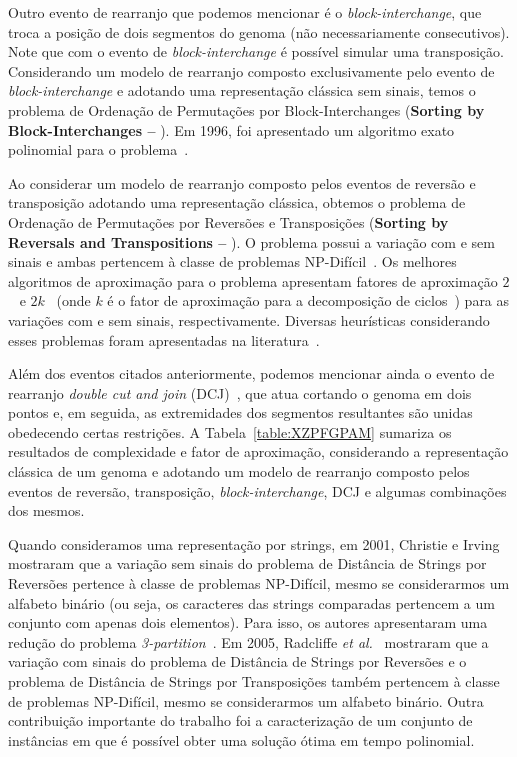 Outro evento de rearranjo que podemos mencionar é o \emph{block-interchange}, que troca a posição de dois segmentos do genoma (não necessariamente consecutivos). Note que com o evento de \emph{block-interchange} é possível simular uma transposição. Considerando um modelo de rearranjo composto exclusivamente pelo evento de \emph{block-interchange} e adotando uma representação clássica sem sinais, temos o problema de Ordenação de Permutações por Block-Interchanges (\textbf{Sorting by Block-Interchanges --} \SbBI). Em 1996, foi apresentado um algoritmo exato polinomial para o problema~\cite{1996-christie}.

Ao considerar um modelo de rearranjo composto pelos eventos de reversão e transposição adotando uma representação clássica, obtemos o problema de Ordenação de Permutações por Reversões e Transposições (\textbf{Sorting by Reversals and Transpositions --} \SbRT). O problema possui a variação com e sem sinais e ambas pertencem à classe de problemas NP-Difícil~\cite{2019b-oliveira-etal}. Os melhores algoritmos de aproximação para o problema apresentam fatores de aproximação $2$~\cite{1998-walter-etal} e $2k$~\cite{2008-rahman-etal} (onde $k$ é o fator de aproximação para a decomposição de ciclos~\cite{2013-chen}) para as variações com e sem sinais, respectivamente. Diversas heurísticas considerando esses problemas foram apresentadas na literatura~\cite{2014a-dias-etal,2018-brito-etal}.

Além dos eventos citados anteriormente, podemos mencionar ainda o evento de rearranjo \emph{double cut and join} (DCJ)~\cite{2005-yancopoulos-etal}, que atua cortando o genoma em dois pontos e, em seguida, as extremidades dos segmentos resultantes são unidas obedecendo certas restrições. A Tabela~\ref{table:XZPFGPAM} sumariza os resultados de complexidade e fator de aproximação, considerando a representação clássica de um genoma e adotando um modelo de rearranjo composto pelos eventos de reversão, transposição, \emph{block-interchange}, DCJ e algumas combinações dos mesmos. 



Quando consideramos uma representação por strings, em 2001, Christie e Irving~\cite{2001-christie-irving} mostraram que a variação sem sinais do problema de Distância de Strings por Reversões pertence à classe de problemas NP-Difícil, mesmo se considerarmos um alfabeto binário (ou seja, os caracteres das strings comparadas pertencem a um conjunto com apenas dois elementos). Para isso, os autores apresentaram uma redução do problema \emph{3-partition}~\cite{1990-garey-johnson}. Em 2005, Radcliffe \textit{et al.}~\cite{2005-radcliffe-etal} mostraram que a variação com sinais do problema de Distância de Strings por Reversões e o problema de Distância de Strings por Transposições também pertencem à classe de problemas NP-Difícil, mesmo se considerarmos um alfabeto binário. Outra contribuição importante do trabalho foi a caracterização de um conjunto de instâncias em que é possível obter uma solução ótima em tempo polinomial.

